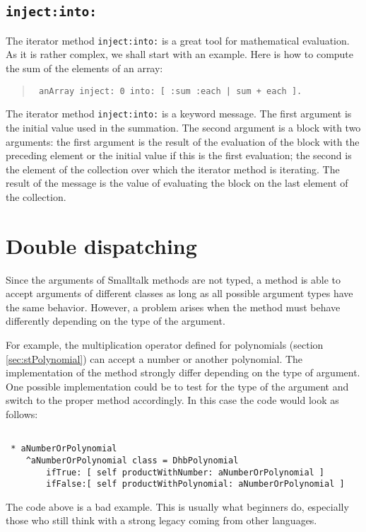 \documentclass[twoside]{book}
\begin{document}
\subsection{\tt inject:into:}
\label{sec:injectinto} The iterator method {\tt inject:into:} is a
great tool for mathematical evaluation. As it is rather complex,
we shall start with an example. Here is how to compute the sum of
the elements of an array:
\begin{quote}
\begin{verbatim}
 anArray inject: 0 into: [ :sum :each | sum + each ].
\end{verbatim}
\end{quote}
The iterator method {\tt inject:into:} is a keyword message. The
first argument is the initial value used in the summation. The
second argument is a  block with two arguments: the first
argument is the result of the evaluation of the  block with
the preceding element or the initial value if this is the first
evaluation; the second is the element of the collection over which
the iterator method is iterating. The result of  the message is
the value of evaluating the block on the last element of the
collection.

\section{Double dispatching}
\label{sec:doubledisp} Since the arguments of Smalltalk methods
are not typed, a method is able to accept arguments of different
classes as long as all possible argument types have the same
behavior. However, a problem arises when the method must behave
differently depending on the type of the argument.

For example, the multiplication operator defined for polynomials
(\cf section \ref{sec:stPolynomial}) can accept a number or
another polynomial. The implementation of the method strongly
differ depending on the type of argument. One possible
implementation could be to test for the type of the argument and
switch to the proper method accordingly. In this case the code
would look as follows:
\begin{codeExample}
\begin{verbatim}

 * aNumberOrPolynomial
    ^aNumberOrPolynomial class = DhbPolynomial
        ifTrue: [ self productWithNumber: aNumberOrPolynomial ]
        ifFalse:[ self productWithPolynomial: aNumberOrPolynomial ]
\end{verbatim}
\end{codeExample}
The code above is a bad example. This is usually what beginners
do, especially those who still think with a strong legacy coming
from other languages.
\end{document}
